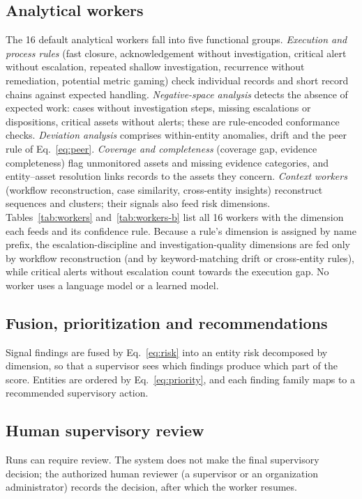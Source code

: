 

\subsection{Analytical workers}
The 16 default analytical workers fall into five functional groups.
\emph{Execution and process rules} (fast closure, acknowledgement without
investigation, critical alert without escalation, repeated shallow investigation,
recurrence without remediation, potential metric gaming) check individual records and
short record chains against expected handling. \emph{Negative-space analysis} detects
the absence of expected work: cases without investigation steps, missing escalations
or dispositions, critical assets without alerts; these are rule-encoded conformance
checks. \emph{Deviation analysis} comprises within-entity anomalies, drift and the peer
rule of Eq.~\eqref{eq:peer}. \emph{Coverage and completeness} (coverage gap, evidence
completeness) flag unmonitored assets and missing evidence categories, and
entity--asset resolution links records to the assets they concern. \emph{Context workers} (workflow reconstruction, case similarity,
cross-entity insights) reconstruct sequences and clusters; their signals also feed risk
dimensions. Tables~\ref{tab:workers} and~\ref{tab:workers-b} list all 16 workers with the
dimension each feeds and its confidence rule. Because a rule's dimension is assigned by
name prefix, the escalation-discipline and investigation-quality dimensions are fed only
by workflow reconstruction (and by keyword-matching drift or cross-entity rules), while
critical alerts without escalation count towards the execution gap. No worker uses a
language model or a learned model.



\subsection{Fusion, prioritization and recommendations}
Signal findings are fused by Eq.~\eqref{eq:risk} into an entity risk decomposed by
dimension, so that a supervisor sees which findings produce which part of the score.
Entities are ordered by Eq.~\eqref{eq:priority}, and each finding family maps to a
recommended supervisory action.

\subsection{Human supervisory review}
Runs can require review. The system does not make the final supervisory decision; the
authorized human reviewer (a supervisor or an organization administrator) records the
decision, after which the worker resumes.

